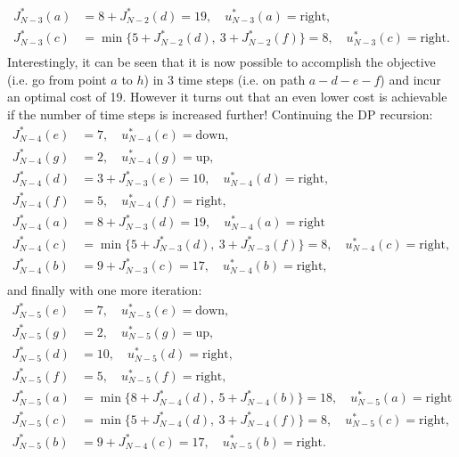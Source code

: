\begin{example}
\begin{equation*}
\begin{split}
J^*_{N-3}(a) &= 8 + J^*_{N-2}(d) = 19, \quad u^*_{N-3}(a) = \text{right}, \\
J^*_{N-3}(c) &= \min \{5 + J^*_{N-2}(d), \:3 + J^*_{N-2}(f)\} = 8, \quad u^*_{N-3}(c) = \text{right}. \\
\end{split}
\end{equation*}
Interestingly, it can be seen that it is now possible to accomplish the objective (i.e. go from point $a$ to $h$) in 3 time steps (i.e. on path $a-d-e-f$) and incur an optimal cost of 19. However it turns out that an even lower cost is achievable if the number of time steps is increased further! Continuing the DP recursion:
\begin{equation*}
\begin{split}
J^*_{N-4}(e) & = 7, \quad u^*_{N-4}(e) = \text{down}, \\
J^*_{N-4}(g) &= 2, \quad u^*_{N-4}(g) = \text{up}, \\
J^*_{N-4}(d) &= 3 + J^*_{N-3}(e) = 10, \quad u^*_{N-4}(d) = \text{right}, \\
J^*_{N-4}(f) &= 5,  \quad u^*_{N-4}(f) = \text{right},\\
J^*_{N-4}(a) &= 8 + J^*_{N-3}(d) = 19, \quad u^*_{N-4}(a) = \text{right} \\
J^*_{N-4}(c) &= \min \{5 + J^*_{N-3}(d), \:3 + J^*_{N-3}(f)\} = 8, \quad u^*_{N-4}(c) = \text{right}, \\
J^*_{N-4}(b) &= 9 + J^*_{N-3}(c) = 17, \quad u^*_{N-4}(b) = \text{right},\\
\end{split}
\end{equation*}
and finally with one more iteration:
\begin{equation*}
\begin{split}
J^*_{N-5}(e) & = 7, \quad u^*_{N-5}(e) = \text{down}, \\
J^*_{N-5}(g) &= 2, \quad u^*_{N-5}(g) = \text{up}, \\
J^*_{N-5}(d) &= 10, \quad u^*_{N-5}(d) = \text{right}, \\
J^*_{N-5}(f) &= 5, \quad u^*_{N-5}(f) = \text{right}, \\
J^*_{N-5}(a) &= \min \{8 + J^*_{N-4}(d), \:5 + J^*_{N-4}(b)\} = 18, \quad u^*_{N-5}(a) = \text{right} \\
J^*_{N-5}(c) &= \min \{5 + J^*_{N-4}(d), \:3 + J^*_{N-4}(f)\} = 8, \quad u^*_{N-5}(c) = \text{right}, \\
J^*_{N-5}(b) &= 9 + J^*_{N-4}(c) = 17, \quad u^*_{N-5}(b) = \text{right}. \\

\end{split}
\end{equation*}
\end{example}
